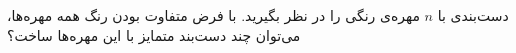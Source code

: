 دست‌بندی با
$n$
مهره‌ی رنگی را در نظر بگیرید. با فرض متفاوت بودن رنگ‌ همه مهره‌ها، می‌توان چند دست‌بند متمایز با این مهره‌ها ساخت؟